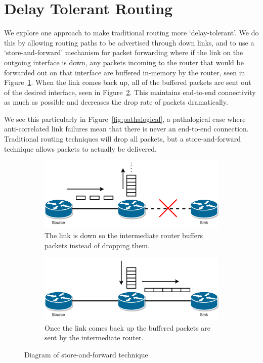 \documentclass[withindex,glossary,openany]{cam-thesis}
\begin{document}
\section{Delay Tolerant Routing}
We explore one approach to make traditional routing more `delay-tolerant'. We do this by allowing routing paths to be advertised through down links, and to use a `store-and-forward' mechanism \cite{SAF} for packet forwarding where if the link on the outgoing interface is down, any packets incoming to the router that would be forwarded out on that interface are buffered in-memory by the router, seen in Figure~\ref{fig:saf_down}. When the link comes back up, all of the buffered packets are sent out of the desired interface, seen in Figure~\ref{fig:saf_up}. This maintains end-to-end connectivity as much as possible and decreases the drop rate of packets dramatically.

We see this particularly in Figure~\ref{fig:pathalogical}, a pathalogical case where anti-correlated link failures mean that there is never an end-to-end connection. Traditional routing techniques will drop all packets, but a store-and-forward technique allows packets to actually be delivered.

\begin{center}
\begin{minipage}{0.9\textwidth} \centering
\begin{figure}[H]
\centering
\begin{subfigure}{.65\textwidth}
  \centering
  \includegraphics[width=1\linewidth]{storeandforward_down}
  \caption{The link is down so the intermediate router buffers packets instead of dropping them.}
  \label{fig:saf_down}
\end{subfigure}
\begin{subfigure}{.65\textwidth}
  \centering
  \includegraphics[width=1\linewidth]{storeandforward_up}
  \caption{Once the link comes back up the buffered packets are sent by the intermediate router.}
  \label{fig:saf_up}
\end{subfigure}
\caption{Diagram of store-and-forward technique}
\label{fig:saf}
\end{figure}
\end{minipage}
\end{center}
\end{document}
